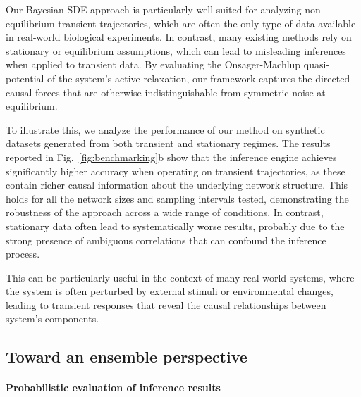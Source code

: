 \documentclass[10pt, aps, rmp,  twocolumn, superscriptaddress, floatfix, showkeys]{revtex4-2}
\begin{document}

Our Bayesian SDE approach is particularly well-suited for analyzing non-equilibrium transient trajectories, which are often the only type of data available in real-world biological experiments. In contrast, many existing methods rely on stationary or equilibrium assumptions, which can lead to misleading inferences when applied to transient data. By evaluating the Onsager-Machlup quasi-potential of the system's active relaxation, our framework captures the directed causal forces that are otherwise indistinguishable from symmetric noise at equilibrium.

To illustrate this, we analyze the performance of our method on synthetic datasets generated from both transient and stationary regimes. The results reported in Fig.~\ref{fig:benchmarking}b show that the inference engine achieves significantly higher accuracy when operating on transient trajectories, as these contain richer causal information about the underlying network structure. This holds for all the network sizes and sampling intervals tested, demonstrating the robustness of the approach across a wide range of conditions.
In contrast, stationary data often lead to systematically worse results, probably due to the strong presence of ambiguous correlations that can confound the inference process.

This can be particularly useful in the context of many real-world systems, where the system is often perturbed by external stimuli or environmental changes, leading to transient responses that reveal the causal relationships between system's components.

\subsection{Toward an ensemble perspective}


\paragraph{Probabilistic evaluation of inference results\\}
\end{document}
